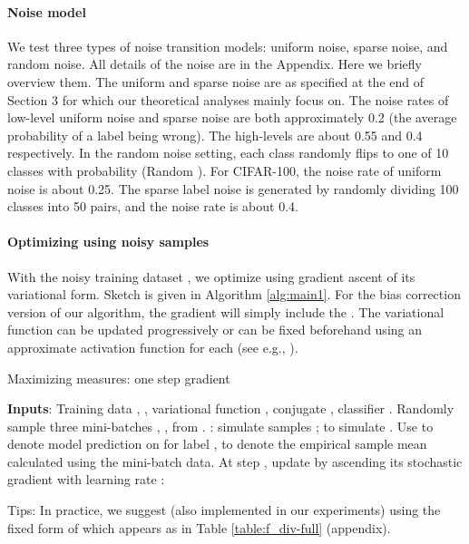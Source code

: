 \documentclass{article}
\begin{document}
\paragraph{Noise model} We test three types of noise transition models: uniform noise, sparse noise, and random noise. All details of the noise are in the Appendix. Here we briefly overview them. The uniform and sparse noise are as specified at the end of Section 3 for which our theoretical analyses mainly focus on. The noise rates of low-level uniform noise and sparse noise are both approximately 0.2 (the average probability of a label being wrong). 
The high-levels are about 0.55 and 0.4 respectively. In the random noise setting, each class randomly flips to one of 10 classes with probability  (Random ). For CIFAR-100, the noise rate of uniform noise is about 0.25. The sparse label noise is generated by randomly dividing 100 classes into 50 pairs, and the noise rate is about 0.4. 

\vspace{-0.02in}
\paragraph{Optimizing  using noisy samples}
With the noisy training dataset , we optimize  using gradient ascent of its variational form. Sketch is given in Algorithm \ref{alg:main1}. For the bias correction version of our algorithm, the gradient will simply include the . The variational function  can be updated progressively or can be fixed beforehand using an approximate activation function for each  (see e.g., \citep{nowozin2016f}). 
\begin{algorithm}
\caption{Maximizing  measures: one step gradient}\label{alg:main1}
\begin{algorithmic}[1]
\STATE \textbf{Inputs}: Training data , , variational function , conjugate , classifier . 
\STATE Randomly sample three mini-batches , ,  from . : simulate samples ;  
 to simulate . 
\STATE Use  to denote model prediction on  for label ,   to denote the empirical sample mean calculated using the mini-batch data.
\STATE At step , update  by ascending its stochastic gradient with learning rate : 
 
Tips: In practice, we suggest (also implemented in our experiments) using the fixed form of  which appears as  in Table \ref{table:f_div-full} (appendix).
\end{algorithmic}
\end{algorithm}
\end{document}
